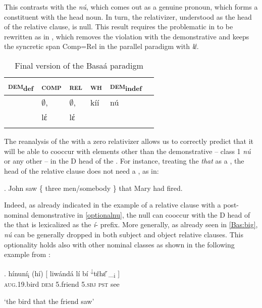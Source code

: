 \vskip -0.75cm
\noindent
This contrasts with the  \textit{n\'u}, which comes out as a genuine  pronoun, which forms a constituent with the head noun. In turn, the relativizer, understood as the head of the relative clause, is null. This result requires the problematic  in  to be rewritten as in , which removes the  violation with the demonstrative and keeps the syncretic span Comp=Rel in the parallel paradigm with \textit{lέ}.

\begin{table}
\caption{Final version of the Basa\'a paradigm}
\label{table4}
\begin{tabular}[h]{ l l l l l l }
\lsptoprule
\textsc{dem}\textsubscript{def} & \textsc{comp} 	& \textsc{rel}  	& \textsc{wh} & \textsc{dem}\textsubscript{indef}\\	
\midrule
 & $\emptyset$\cellcolor[gray]{0.9}, & $\emptyset$\cellcolor[gray]{0.9}, & k\'i\'i  & n\'u\\
   & lέ\cellcolor[gray]{0.8} & lέ\cellcolor[gray]{0.8} & \\
\lspbottomrule
\end{tabular}
\end{table}

\noindent
The reanalysis of the  with a zero relativizer allows us to correctly predict that it will be able to cooccur with elements other than the demonstrative -- class 1 \textit{n\'u} or any other -- in the D head of the . For instance, treating the  \textit{that} as a , the head of the relative clause does not need a , as in:

\ex. John saw \{ three men\slash somebody \} that Mary had fired.

Indeed, as already indicated in the example of a relative clause with a post-nominal demonstrative in \ref{optionalnu}, the null  can cooccur with the D head of the  that is lexicalized as the \textit{\'i}- prefix.  More generally, as already seen in \ref{Bas:big}, \textit{n\'u} can be generally dropped in both subject and object relative clauses. This optionality holds also with other nominal classes  as shown in the following example from \citet[18]{Jenks-etall}:

\exg. 
h\'inun\'i\textsubscript{i} (h\'i) [ liw\'and\'a l\'i b\'i \textsuperscript{↓}tέhɛ̌  \_\textsubscript{i} ]\\
\textsc{aug}.19.bird \textsc{dem} {} 5.friend 5.\textsc{sbj} \textsc{pst} see \\
\strut `the bird that the friend saw'



